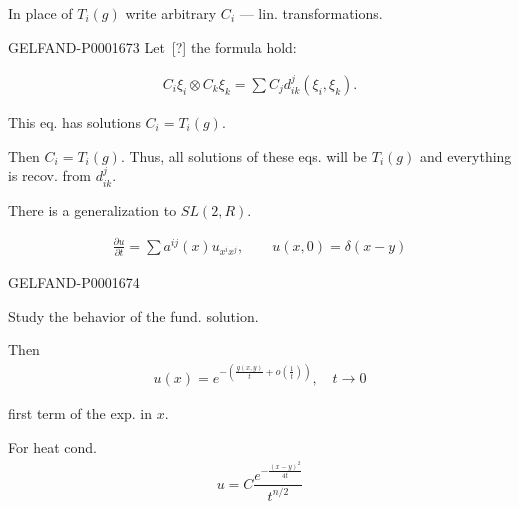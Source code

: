 In place of $T_i (g)$ write arbitrary $C_i$ — lin. transformations.

\begin{GelfandAdjacentEvidence}{GELFAND-P000167}{3}
Let\, [?] the formula hold:
\end{GelfandAdjacentEvidence}

\begin{gather*}
C_i\xi_i\otimes C_k\xi_k=\sum C_jd^j_{ik}(\xi_i,\xi_k).
\end{gather*}


This eq. has solutions $C_i=T_i (g)$.

Then $C_i=T_i (g)$. Thus, all solutions of these eqs. will be $T_i (g)$ and everything is recov. from $d^j_{ik}$.

There is a generalization to $SL (2, R)$.




\begin{gather*}
\frac{\partial u}{\partial t}=\sum a^{ij}(x)u_{x^ix^j},\qquad
u (x,0)=\delta (x-y)
\end{gather*}

\begin{GelfandAdjacentEvidence}{GELFAND-P000167}{4}

Study the behavior of the fund. solution.
\end{GelfandAdjacentEvidence}




Then
\begin{gather*}
u (x)=e^{-\left (\frac{g (x, y)}{t}+o (\frac{1}{t})\right)},\quad t\longrightarrow0
\end{gather*}


first term of the exp. in $x$.


For heat cond.
\begin{gather*}
u=C\dfrac{e^{-\frac{(x-y)^2}{4t}}}{t^{n/2}}
\end{gather*}

